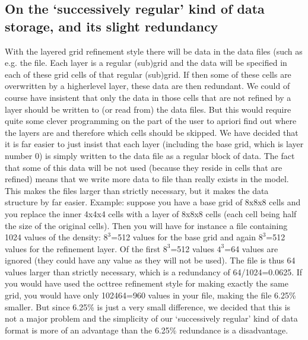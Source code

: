 \documentclass[letterpaper,10pt,english]{sphinxmanual}
\begin{document}
\subsection{On the ‘successively regular’ kind of data storage, and its slight redundancy}
\label{\detokenize{gridding:on-the-successively-regular-kind-of-data-storage-and-its-slight-redundancy}}\label{\detokenize{gridding:sec-layer-amr-redundancy}}
With the layered grid refinement style there will be  data in the
data files (such as e.g. the  file. Each layer is a regular
(sub\sphinxhyphen{})grid and the data will be specified in each of these grid cells of that
regular (sub\sphinxhyphen{})grid.  If then some of these cells are overwritten by a
higher\sphinxhyphen{}level layer, these data are then redundant. We could of course have
insistent that only the data in those cells that are not refined by a layer
should be written to (or read from) the data files. But this would require quite
some clever programming on the part of the user to a\sphinxhyphen{}priori find out where the
layers are and therefore which cells should be skipped. We have decided that it
is far easier to just insist that each layer (including the base grid, which is
layer number 0) is simply written to the data file as a regular block of
data. The fact that some of this data will be not used (because they reside in
cells that are refined) means that we write more data to file than really exists
in the model. This makes the files larger than strictly necessary, but it makes
the data structure by far easier. Example: suppose you have a base grid of 8x8x8
cells and you replace the inner 4x4x4 cells with a layer of 8x8x8 cells (each
cell being half the size of the original cells).  Then you will have for
instance a  file containing 1024 values of the density:
\(8^3\)=512 values for the base grid and again \(8^3\)=512 values for
the refinement layer. Of the first \(8^3\)=512 values \(4^3\)=64 values
are ignored (they could have any value as they will not be used). The file is
thus 64 values larger than strictly necessary, which is a redundancy of
64/1024=0.0625. If you would have used the oct\sphinxhyphen{}tree refinement style for making
exactly the same grid, you would have only 1024\sphinxhyphen{}64=960 values in your file,
making the file 6.25\% smaller. But since 6.25\% is just a very small
difference, we decided that this is not a major problem and the simplicity of
our ‘successively regular’ kind of data format is more of an advantage than the
6.25\% redundance is a disadvantage.
\end{document}
